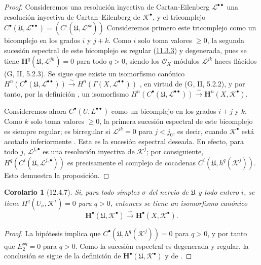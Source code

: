 \documentclass[10pt,oneside,openany]{book}
\theoremstyle{egaenv}\newtheorem*{env}{---}
\theoremstyle{egastatement}
\newtheorem*{corollary}{Corolario}
\theoremstyle{egadescription}
\newcommand{\oldpage}[2][]{\marginnote{\normalfont\scriptsize\textbf{#1}\,|\,#2}\ignorespaces}
\renewcommand{\geq}{\geqslant}
\begin{document}
\begin{proof}
Consideremos una resolución inyectiva de Cartan-Eilenberg $\mathcal L^{\bullet\bullet}$ una resolución inyectiva de
Cartan--Eilenberg de $\mathcal K^\bullet$, y el tricomplejo $C^\bullet(\mathfrak U,\mathcal L^{\bullet\bullet})
=(C^i(\mathfrak U,\mathcal L^{jk}))$
Consideremos primero este tricomplejo como un bicomplejo en los grados $i$ y
$j+k$.
Como $i$ solo toma valores $\geq0$, la segunda sucesión espectral de este bicomplejo es regular (\hyperref[0.11.3.3-fr]{11.3.3}) y degenerada, pues se tiene $\mathbf H^q(\mathfrak U,\mathcal L^{jk})=0$ para todo $q>0$, siendo los $\mathcal O_X$-módulos $\mathcal L^{jk}$ haces flácidos
\oldpage[0\textsubscript{III}]{64}
(G, II, 5.2.3).
Se sigue que existe un isomorfismo canónico
$H^n(C^\bullet(\mathfrak U,\mathcal L^{\bullet\bullet}))\xrightarrow{\sim}H^n(\Gamma(X,\mathcal L^{\bullet\bullet}))$
, en virtud de (G, II, 5.2.2), y por tanto, por la
definición , un isomorfismo
$H^n(C^\bullet(\mathfrak U,\mathcal L^{\bullet\bullet}))\xrightarrow{\sim}\mathbf H^n(X,\mathcal K^\bullet)$.

Consideremos ahora
$C^\bullet(U,L^{\bullet\bullet})$
como un bicomplejo en los grados $i+j$ y $k$.
Como $k$ solo toma valores $\geq0$, la primera sucesión espectral de este bicomplejo es siempre regular; es birregular si $\mathcal L^{jk}=0$ para $j<j_0$, es decir, cuando
$\mathcal K^\bullet$ está acotado inferiormente .
Esta es la sucesión espectral deseada.
En efecto, para todo $j$, $\mathcal L^{j,\bullet}$ es una resolución
inyectiva de $\mathcal K^j$; por consiguiente,
$H^q(C^i(\mathfrak U,\mathcal L^{j,\bullet}))$
es precisamente el complejo de cocadenas
$C^i(\mathfrak U,h^q(\mathcal K^j))$.
Esto demuestra la proposición.
\end{proof}

\begin{corollary}[12.4.7]
\label{0.12.4.7}
\label{0.12.4.7-fr}
Si, para todo símplex $\sigma$ del nervio de $\mathfrak U$ y
todo entero $i$, se tiene $H^q(U_\sigma,\mathcal K^i)=0$ para $q>0$, entonces se tiene un isomorfismo canónico
\begin{equation}
\label{0.12.4.7.1-fr}
\tag{12.4.7.1}
\mathbf H^\bullet(\mathfrak U,\mathcal K^\bullet)
\xrightarrow{\sim}\mathbf H^\bullet(X,\mathcal K^\bullet).
\end{equation}
\end{corollary}

\begin{proof}
La hipótesis implica que
$C^\bullet(\mathfrak U,h^q(\mathcal K^j))=0$ para $q>0$, y por tanto que
$E_2^{pq}=0$ para $q>0$.
Como la sucesión espectral  es degenerada y
regular, la conclusión se sigue de la definición
 de
$\mathbf H^\bullet(\mathfrak U,\mathcal K^\bullet)$ y de
.
\end{proof}
\end{document}
